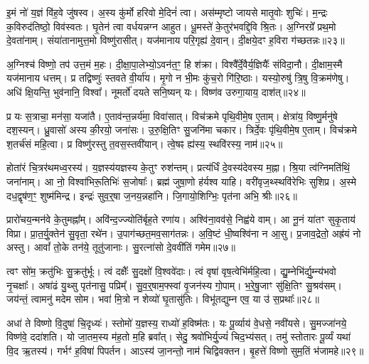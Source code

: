 इ॒मं नो॑ य॒ज्ञं वि॑ह॒वे जु॑षस्व।
अ॒स्य कु॑र्मो हरिवो मे॒दिनं॑ त्वा।
अस॑म्मृष्टो जायसे मातृ॒वोः शुचिः॑।
म॒न्द्रः क॒विरुद॑तिष्ठो॒ विव॑स्वतः।
घृ॒तेन॑ त्वा वर्धयन्नग्न आहुत।
धू॒मस्ते॑ के॒तुर॑भवद्दि॒वि श्रि॒तः।
अ॒ग्निरग्रे᳚ प्रथ॒मो दे॒वता॑नाम्।
संया॑तानामुत्त॒मो विष्णु॑रासीत्।
यज॑मानाय परि॒गृह्य॑ दे॒वान्।
दी॒क्षये॒दꣳ ह॒विरा ग॑च्छतन्नः॥२३॥\ip

अ॒ग्निश्च॑ विष्णो॒ तप॑ उत्त॒मं म॒हः।
दी॒क्षा॒पा॒लेभ्यो॒\-ऽवन॑त॒ꣳ॒ हि श॑क्रा।
विश्वै᳚र्दे॒वैर्य॒ज्ञियैः᳚ संविदा॒नौ।
दी॒क्षाम॒स्मै यज॑मानाय धत्तम्।
प्र तद्विष्णुः॑ स्तवते वी॒र्या॑य।
मृ॒गो न भी॒मः कु॑च॒रो गि॑रि॒ष्ठाः।
यस्यो॒रुषु॑ त्रि॒षु वि॒क्रम॑णेषु।
अधि॑ क्षि॒यन्ति॒ भुव॑नानि॒ विश्वा᳚।
नूमर्तो॑ दयते सनि॒ष्यन् यः।
विष्ण॑व उरुगा॒याय॒ दाश॑त्॥२४॥\ip

प्र यः स॒त्राचा॒ मन॑सा॒ यजा॑तै।
ए॒ताव॑न्त॒न्नर्य॑मा॒ विवा॑सात्।
विच॑क्रमे पृथि॒वीमे॒ष ए॒ताम्।
क्षेत्रा॑य॒ विष्णु॒र्मनु॑षे दश॒स्यन्।
ध्रु॒वासो॑ अस्य की॒रयो॒ जना॑सः।
उ॒रु॒क्षि॒तिꣳ सु॒जनि॑मा चकार।
त्रिर्दे॒वः पृ॑थि॒वीमे॒ष ए॒ताम्।
विच॑क्रमे श॒तर्च॑सं महि॒त्वा।
प्र विष्णु॑रस्तु त॒वस॒स्तवी॑यान्।
त्वे॒षꣴ ह्य॑स्य॒ स्थवि॑रस्य॒ नाम॑॥२५॥\ip

होता॑रं चि॒त्रर॑थमध्व॒रस्य॑।
य॒ज्ञस्य॑यज्ञस्य के॒तुꣳ रुश॑न्तम्।
प्रत्य॑र्धिं दे॒वस्य॑देवस्य म॒ह्ना।
श्रि॒या त्व॑ग्निमति॑थिं॒ जना॑नाम्।
आ नो॒ विश्वा॑भिरू॒तिभिः॑ स॒जोषाः᳚।
ब्रह्म॑ जुषा॒णो ह॑र्यश्व याहि।
वरी॑वृज॒थ्स्थवि॑रेभिः सुशिप्र।
अ॒स्मे दध॒द्वृष॑ण॒ꣳ॒ शुष्म॑मिन्द्र।
इन्द्रः॑ सुव॒र्॒षा ज॒नय॒न्नहा॑नि।
जि॒गायो॒शिग्भिः॒ पृत॑ना अभि॒ श्रीः॥२६॥\ip

प्रारो॑चय॒न्मन॑वे के॒तुमह्ना᳚म्।
अवि॑न्द॒ज्ज्योति॑र्बृह॒ते रणा॑य।
अश्वि॑ना॒वव॑से॒ निह्व॑ये वाम्।
आ नू॒नं या॑तꣳ सुकृ॒ताय॑ विप्रा।
प्रा॒त॒र्यु॒क्तेन॑ सु॒वृता॒ रथे॑न।
उ॒पाग॑च्छत॒मव॒साग॑तन्नः।
अ॒वि॒ष्टं धी॒ष्वश्वि॑ना न आ॒सु।
प्र॒जाव॒द्रेतो॒ अह्र॑यं नो अस्तु।
आवां᳚ तो॒के तन॑ये॒ तूतु॑जानाः।
सु॒रत्ना॑सो दे॒ववी॑तिं गमेम॥२७॥\ip

त्वꣳ सो॑म॒ क्रतु॑भिः सु॒क्रतु॑र्भूः।
त्वं दक्षैः᳚ सु॒दक्षो॑ वि॒श्ववे॑दाः।
त्वं वृषा॑ वृष॒त्वेभि॑र्महि॒त्वा।
द्यु॒म्नेभि॑र्द्यु॒म्न्य॑भवो नृ॒चक्षाः᳚।
अषा॑ढं यु॒थ्सु पृत॑नासु॒ पप्रिम्᳚।
सु॒व॒र्॒षाम॒फ्स्वां वृ॒जन॑स्य गो॒पाम्।
भ॒रे॒षु॒जाꣳ सु॑क्षि॒तिꣳ सु॒श्रव॑सम्।
जय॑न्तं॒ त्वामनु॑ मदेम सोम।
भवा॑ मि॒त्रो न शेव्यो॑ घृ॒तासु॑तिः।
विभू॑तद्युम्न एव॒ या उ॑ स॒प्रथाः᳚॥२८॥\ip

अधा॑ ते विष्णो वि॒दुषा॑ चि॒दृध्यः॑।
स्तोमो॑ य॒ज्ञस्य॒ राध्यो॑ ह॒विष्म॑तः।
यः पू॒र्व्याय॑ वे॒धसे॒ नवी॑यसे।
सु॒मज्जा॑नये॒ विष्ण॑वे॒ ददा॑शति।
यो जा॒तम॒स्य म॑ह॒तो म॒हि ब्रवा᳚त्।
सेदु॒ श्रवो॑भिर्यु॒ज्यं॑         चिद॒भ्य॑सत्।
तमु॑ स्तोतारः पू॒र्व्यं यथा॑ वि॒द ऋ॒तस्य॑।
गर्भꣳ॑ ह॒विषा॑ पिपर्तन।
आऽस्य॑ जा॒नन्तो॒ नाम॑ चिद्विवक्तन।
बृ॒हत्ते॑ विष्णो सुम॒तिं भ॑जामहे॥२९॥\ip

